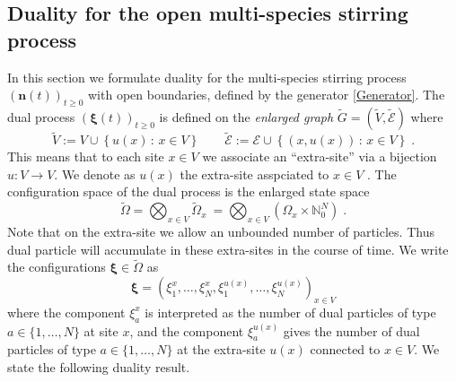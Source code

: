 \documentclass[10pt]{article}
\numberwithin{equation}{section}
\numberwithin{equation}{subsection}
\newcommand{\dt}{\;.}
\begin{document}
\subsection{Duality for the open multi-species stirring process}\label{statementDualitySubsection}
In this section we formulate duality for the multi-species stirring process $(\bm{n}(t))_{t\geq 0}$ with open boundaries, defined by the generator \eqref{Generator}.
The dual  process $(\bm{\xi}(t))_{t\geq 0}$ is defined on the \textit{enlarged graph} $\widetilde{G}=(\widetilde{V},\widetilde{\mathcal{E}})$ where 
\begin{equation}
	\widetilde{V}:=V\cup \left\{u(x)\,:\, x\in V\right\}\qquad \widetilde{\mathcal{E}}:=\mathcal{E}\cup \left\{(x,u(x))\,:\, x\in V\right\}\dt
\end{equation}
This means that to each site $x\in V$ we associate an ``extra-site'' via a bijection $u:V\to V$. We denote as $u(x)$ the extra-site asspciated to $x\in V$ . The configuration space of the dual process is the enlarged state space
\begin{equation}\label{dualStateSpace}
    \widetilde{\Omega}= \bigotimes_{x\in V} \widetilde{\Omega}_{x}\ = \bigotimes_{x\in V} (\Omega_{x}\times \mathbb{N}_{0}^{N})\dt
\end{equation}
Note that on the extra-site we allow an unbounded number of particles. Thus
dual particle will accumulate in these extra-sites in the course of time. 
We write the configurations $\bm{\xi} \in \widetilde\Omega$  as
\begin{equation}
    \bm{\xi}=\left(\xi_{1}^{x},\ldots,\xi_{N}^{x},\xi_{1}^{u(x)},\ldots,\xi_{N}^{u(x)}\right)_{x\in V}
\end{equation}
where the component $\xi_{a}^{x}$ is interpreted as the number of dual particles of type $a\in \{1,\ldots,N\}$ at site $x$, 
and the component $\xi_{a}^{u(x)}$  gives the number of dual particles of type $a\in \{1,\ldots,N\}$ at 
the extra-site $u(x)$ connected to $x\in V$. We state the following duality result.
\end{document}
